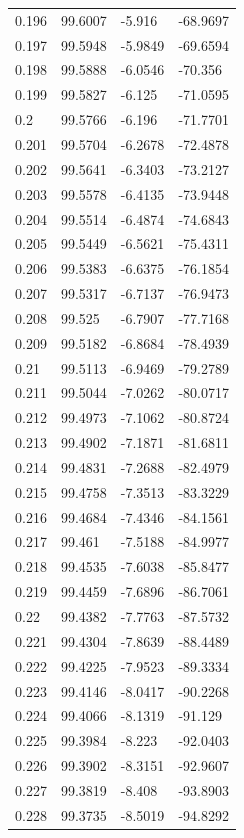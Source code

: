 \begin{tabular}{llll}
0.196 & 99.6007 & -5.916 & -68.9697 \\
0.197 & 99.5948 & -5.9849 & -69.6594 \\
0.198 & 99.5888 & -6.0546 & -70.356 \\
0.199 & 99.5827 & -6.125 & -71.0595 \\
0.2 & 99.5766 & -6.196 & -71.7701 \\
0.201 & 99.5704 & -6.2678 & -72.4878 \\
0.202 & 99.5641 & -6.3403 & -73.2127 \\
0.203 & 99.5578 & -6.4135 & -73.9448 \\
0.204 & 99.5514 & -6.4874 & -74.6843 \\
0.205 & 99.5449 & -6.5621 & -75.4311 \\
0.206 & 99.5383 & -6.6375 & -76.1854 \\
0.207 & 99.5317 & -6.7137 & -76.9473 \\
0.208 & 99.525 & -6.7907 & -77.7168 \\
0.209 & 99.5182 & -6.8684 & -78.4939 \\
0.21 & 99.5113 & -6.9469 & -79.2789 \\
0.211 & 99.5044 & -7.0262 & -80.0717 \\
0.212 & 99.4973 & -7.1062 & -80.8724 \\
0.213 & 99.4902 & -7.1871 & -81.6811 \\
0.214 & 99.4831 & -7.2688 & -82.4979 \\
0.215 & 99.4758 & -7.3513 & -83.3229 \\
0.216 & 99.4684 & -7.4346 & -84.1561 \\
0.217 & 99.461 & -7.5188 & -84.9977 \\
0.218 & 99.4535 & -7.6038 & -85.8477 \\
0.219 & 99.4459 & -7.6896 & -86.7061 \\
0.22 & 99.4382 & -7.7763 & -87.5732 \\
0.221 & 99.4304 & -7.8639 & -88.4489 \\
0.222 & 99.4225 & -7.9523 & -89.3334 \\
0.223 & 99.4146 & -8.0417 & -90.2268 \\
0.224 & 99.4066 & -8.1319 & -91.129 \\
0.225 & 99.3984 & -8.223 & -92.0403 \\
0.226 & 99.3902 & -8.3151 & -92.9607 \\
0.227 & 99.3819 & -8.408 & -93.8903 \\
0.228 & 99.3735 & -8.5019 & -94.8292 \\

\end{tabular}

